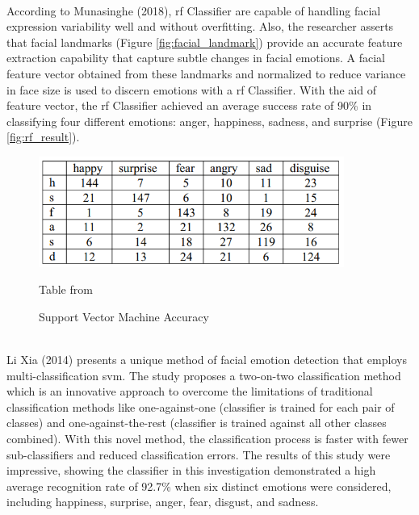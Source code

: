 \\
\indent According to Munasinghe (2018), \gls{rf} Classifier are capable of handling facial expression variability well and without overfitting.
Also, the researcher asserts that facial landmarks (Figure \ref{fig:facial_landmark}) provide an accurate feature extraction capability that capture subtle changes in facial emotions.
A facial feature vector obtained from these landmarks and normalized to reduce variance in face size is used to discern emotions with a \gls{rf} Classifier.
With the aid of feature vector, the \gls{rf} Classifier achieved an average success rate of 90\% in classifying four different emotions: anger, happiness, sadness, and surprise (Figure \ref{fig:rf_result}).
\\
\begin{figure}[!ht]
    \centering
    \includegraphics[width=10cm]{Images/svm_result.png}
    \caption{Support Vector Machine Accuracy} \footnotesize{Table from \citep{xia_2014_facial}}
    \label{fig:svm_result}
\end{figure}
\\
\indent Li Xia (2014) presents a unique method of facial emotion detection that employs multi-classification \gls{svm}.
The study proposes a two-on-two classification method which is an innovative approach to overcome the limitations of traditional classification methods like one-against-one (classifier is trained for each pair of classes) and one-against-the-rest (classifier is trained against all other classes combined).
With this novel method, the classification process is faster with fewer sub-classifiers and reduced classification errors.
The results of this study were impressive, showing the classifier in this investigation demonstrated a high average recognition rate of 92.7\% when six distinct emotions were considered, including happiness, surprise, anger, fear, disgust, and sadness. 
\\
